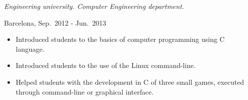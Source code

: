 \begin{description}[itemsep=15pt]
        \emph{Engineering university. Computer Engineering department.}

        Barcelona, Sep.\ 2012 - Jun.\ 2013
        \begin{itemize}[itemsep=0pt]
            \item Introduced students to the basics of computer programming using C language.
            \item Introduced students to the use of the Linux command-line.
            \item Helped students with the development in C of three small games, executed through command-line or graphical interface.
        \end{itemize}

%
%

%
%

\end{description}

